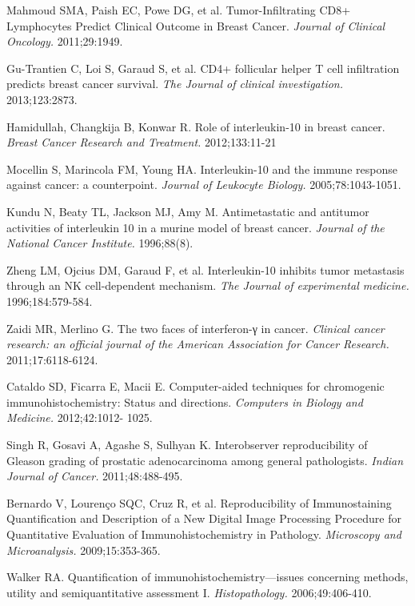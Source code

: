 \documentclass[12pt]{article}
\begin{document}
\noindent[11] Mahmoud SMA, Paish EC, Powe DG, et al. Tumor-Infiltrating CD8+ Lymphocytes Predict Clinical Outcome in Breast Cancer. \textit{Journal of Clinical Oncology.} 2011;29:1949.

\noindent[12] Gu-Trantien C, Loi S, Garaud S, et al. CD4+ follicular helper T cell infiltration predicts breast
cancer survival. \textit{The Journal of clinical investigation.} 2013;123:2873.

\noindent[13] Hamidullah, Changkija B, Konwar R. Role of interleukin-10 in breast cancer. \textit{Breast Cancer Research and Treatment.} 2012;133:11-21

\noindent[14] Mocellin S, Marincola FM, Young HA. Interleukin-10 and the immune response against cancer: a counterpoint. \textit{Journal of Leukocyte Biology.} 2005;78:1043-1051.

\noindent[15] Kundu N, Beaty TL, Jackson MJ, Amy M. Antimetastatic and antitumor activities of interleukin 10 in a murine model of breast cancer. \textit{Journal of the National Cancer Institute.} 1996;88(8).

\noindent[16] Zheng LM, Ojcius DM, Garaud F, et al. Interleukin-10 inhibits tumor metastasis through an NK cell-dependent mechanism. \textit{The Journal of experimental medicine.} 1996;184:579-584.

\noindent[17] Zaidi MR, Merlino G. The two faces of interferon-γ in cancer. \textit{Clinical cancer research: an official journal of the American Association for Cancer Research.} 2011;17:6118-6124.

\noindent[18] Cataldo SD, Ficarra E, Macii E. Computer-aided techniques for chromogenic immunohistochemistry: Status and directions. \textit{Computers in Biology and Medicine.} 2012;42:1012-
1025.

\noindent[19] Singh R, Gosavi A, Agashe S, Sulhyan K. Interobserver reproducibility of Gleason grading of prostatic adenocarcinoma among general pathologists. \textit{Indian Journal of Cancer.} 2011;48:488-495.

\noindent[20] Bernardo V, Lourenço SQC, Cruz R, et al. Reproducibility of Immunostaining Quantification and Description of a New Digital Image Processing Procedure for Quantitative Evaluation of
Immunohistochemistry in Pathology. \textit{Microscopy and Microanalysis.} 2009;15:353-365.

\noindent[21] Walker RA. Quantification of immunohistochemistry---issues concerning methods, utility and semiquantitative assessment I. \textit{Histopathology.} 2006;49:406-410.
\end{document}
